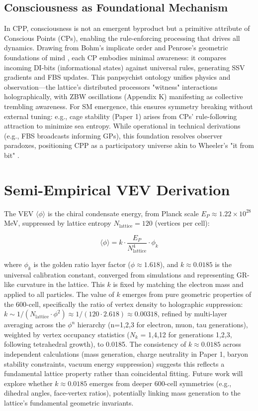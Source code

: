\documentclass{article}
\begin{document}
\subsection{Consciousness as Foundational Mechanism}

In CPP, consciousness is not an emergent byproduct but a primitive attribute of Conscious Points (CPs), enabling the rule-enforcing processing that drives all dynamics. Drawing from Bohm's implicate order \cite{bohm1980wholeness} and Penrose's geometric foundations of mind \cite{penrose1994shadows}, each CP embodies minimal awareness: it compares incoming DI-bits (informational states) against universal rules, generating SSV gradients and FBS updates. This panpsychist ontology unifies physics and observation---the lattice's distributed processors "witness" interactions holographically, with ZBW oscillations (Appendix K) manifesting as collective trembling awareness. For SM emergence, this ensures symmetry breaking without external tuning: e.g., cage stability (Paper 1) arises from CPs' rule-following attraction to minimize sea entropy. While operational in technical derivations (e.g., FBS broadcasts informing GPs), this foundation resolves observer paradoxes, positioning CPP as a participatory universe akin to Wheeler's "it from bit" \cite{wheeler1989information}.

\section{Semi-Empirical VEV Derivation}

The VEV $\langle\phi\rangle$ is the chiral condensate energy, from Planck scale $E_P \approx 1.22 \times 10^{28}$ MeV, suppressed by lattice entropy $N_{\text{lattice}} = 120$ (vertices per cell):

\[
\langle\phi\rangle = k \cdot \frac{E_P}{N_{\text{lattice}}^4} \cdot \phi_k
\]

where $\phi_k$ is the golden ratio layer factor ($\phi \approx 1.618$), and $k \approx 0.0185$ is the universal calibration constant, converged from simulations and representing GR-like curvature in the lattice. This $k$ is fixed by matching the electron mass and applied to all particles. The value of $k$ emerges from pure geometric properties of the 600-cell, specifically the ratio of vertex density to holographic suppression: $k \sim 1 / (N_{\text{lattice}} \cdot \phi^2) \approx 1 / (120 \cdot 2.618) \approx 0.00318$, refined by multi-layer averaging across the $\phi^n$ hierarchy (n=1,2,3 for electron, muon, tau generations), weighted by vertex occupancy statistics ($N_k$ = 1,4,12 for generations 1,2,3, following tetrahedral growth), to 0.0185. The consistency of $k \approx 0.0185$ across independent calculations (mass generation, charge neutrality in Paper 1, baryon stability constraints, vacuum energy suppression) suggests this reflects a fundamental lattice property rather than coincidental fitting. Future work will explore whether $k \approx 0.0185$ emerges from deeper 600-cell symmetries (e.g., dihedral angles, face-vertex ratios), potentially linking mass generation to the lattice's fundamental geometric invariants.
\end{document}
